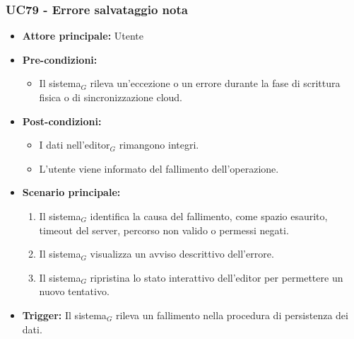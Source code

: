 \documentclass[a4paper, 10pt]{article}
\begin{document}
\subsubsection{UC79 - Errore salvataggio nota}
\hypertarget{uc:79}{}
\begin{itemize}
    \item \textbf{Attore principale:} Utente
    \item \textbf{Pre-condizioni:} 
        \begin{itemize}
            \item Il sistema$_G$ rileva un'eccezione o un errore durante la fase di scrittura fisica o di sincronizzazione cloud.
        \end{itemize}
    \item \textbf{Post-condizioni:} 
        \begin{itemize}
            \item I dati nell'editor$_G$ rimangono integri.
            \item L'utente viene informato del fallimento dell'operazione.
        \end{itemize}
    \item \textbf{Scenario principale:}
        \begin{enumerate}
            \item Il sistema$_G$ identifica la causa del fallimento, come spazio esaurito, timeout del server, percorso non valido o permessi negati.
            \item Il sistema$_G$ visualizza un avviso descrittivo dell'errore.
            \item Il sistema$_G$ ripristina lo stato interattivo dell'editor per permettere un nuovo tentativo.
        \end{enumerate}
    \item \textbf{Trigger:} Il sistema$_G$ rileva un fallimento nella procedura di persistenza dei dati.
\end{itemize}
\end{document}
